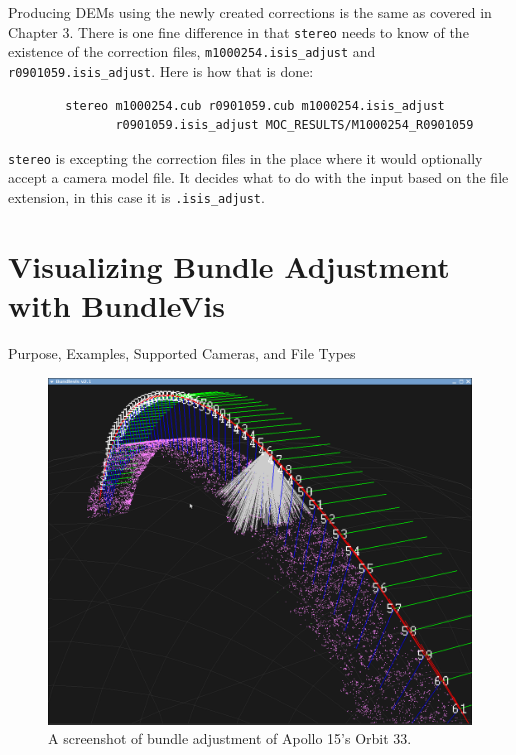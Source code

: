 Producing DEMs using the newly created corrections is the same as
covered in Chapter 3. There is one fine difference in that
\texttt{stereo} needs to know of the existence of the correction
files, \verb=m1000254.isis_adjust= and
\verb=r0901059.isis_adjust=. Here is how that is done:

\begin{verbatim}
        stereo m1000254.cub r0901059.cub m1000254.isis_adjust
               r0901059.isis_adjust MOC_RESULTS/M1000254_R0901059
\end{verbatim}

\texttt{stereo} is excepting the correction files in the place where it would optionally accept a camera model file. It decides what to do with the input based on the file extension, in this case it is \verb=.isis_adjust=.

\section{Visualizing Bundle Adjustment with BundleVis}

Purpose, Examples, Supported Cameras, and File Types

\begin{figure}[htp]
  \begin{center}
  \includegraphics[width=6in]{images/bundlevis_apollo.png}
  \end{center}
  \caption{ A screenshot of bundle adjustment of Apollo 15's Orbit 33. }
  \label{fig:bundlevis}
\end{figure}

